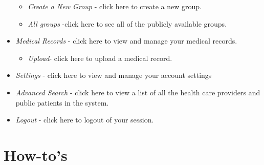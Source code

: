 \begin{itemize}
\begin{itemize}
\item \textit{Create a New Group} - click here to create a new group.
\item \textit{All groups} -click here to see all of the publicly available groups.
\end{itemize}
\item \textit{Medical Records} - click here to view and manage your medical records.
\begin{itemize}
\item \textit{Upload}- click here to upload a medical record.
\end{itemize}
\item \textit{Settings} - click here to view and manage your account settings
\item \textit{Advanced Search} - click here to view a list of all the health care providers and public patients in the system.
\item \textit{Logout} - click here to logout of your session.
\end{itemize}

\section{How-to's}

